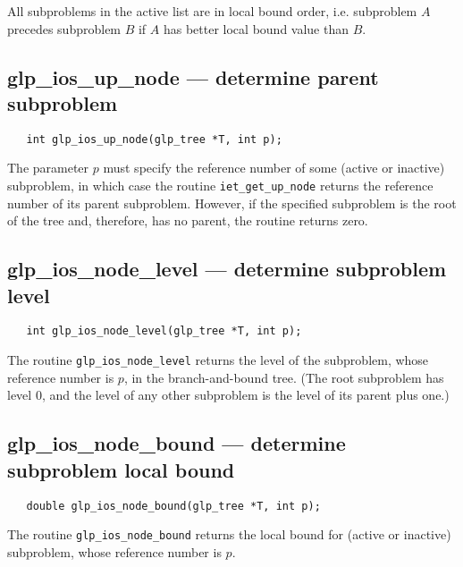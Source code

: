 All subproblems in the active list are in local bound order, i.e.
subproblem $A$ precedes subproblem $B$ if $A$ has better local bound
value than $B$.

\subsection{glp\_ios\_up\_node --- determine parent subproblem}

\synopsis

\begin{verbatim}
   int glp_ios_up_node(glp_tree *T, int p);
\end{verbatim}

\returns

The parameter $p$ must specify the reference number of some (active or
inactive) subproblem, in which case the routine \verb|iet_get_up_node|
returns the reference number of its parent subproblem. However, if the
specified subproblem is the root of the tree and, therefore, has
no parent, the routine returns zero.

\subsection{glp\_ios\_node\_level --- determine subproblem level}

\synopsis

\begin{verbatim}
   int glp_ios_node_level(glp_tree *T, int p);
\end{verbatim}

\returns

The routine \verb|glp_ios_node_level| returns the level of the
subproblem, whose reference number is $p$, in the branch-and-bound
tree. (The root subproblem has level 0, and the level of any other
subproblem is the level of its parent plus one.)

\subsection{glp\_ios\_node\_bound --- determine subproblem local bound}

\synopsis

\begin{verbatim}
   double glp_ios_node_bound(glp_tree *T, int p);
\end{verbatim}

\returns

The routine \verb|glp_ios_node_bound| returns the local bound for
(active or inactive) subproblem, whose reference number is $p$.

